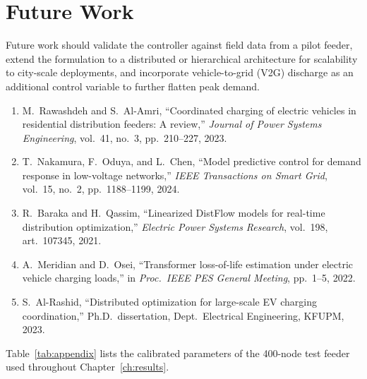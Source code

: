 \documentclass[12pt,twoside]{report}
\begin{document}
\section{Future Work}
Future work should validate the controller against field data from a pilot feeder, extend the
formulation to a distributed or hierarchical architecture for scalability to city-scale
deployments, and incorporate vehicle-to-grid (V2G) discharge as an additional control variable
to further flatten peak demand.

\begingroup
\renewcommand{\chapter}[2][]{\vspace{0.6cm}}
{}
\endgroup

\chapter*{References}
\begin{enumerate}[leftmargin=1.4cm,itemsep=6pt]
\item M.\ Rawashdeh and S.\ Al-Amri, ``Coordinated charging of electric vehicles in
  residential distribution feeders: A review,'' \textit{Journal of Power Systems Engineering},
  vol.\ 41, no.\ 3, pp.\ 210--227, 2023.
\item T.\ Nakamura, F.\ Oduya, and L.\ Chen, ``Model predictive control for demand response in
  low-voltage networks,'' \textit{IEEE Transactions on Smart Grid}, vol.\ 15, no.\ 2,
  pp.\ 1188--1199, 2024.
\item R.\ Baraka and H.\ Qassim, ``Linearized DistFlow models for real-time distribution
  optimization,'' \textit{Electric Power Systems Research}, vol.\ 198, art.\ 107345, 2021.
\item A.\ Meridian and D.\ Osei, ``Transformer loss-of-life estimation under electric vehicle
  charging loads,'' in \textit{Proc.\ IEEE PES General Meeting}, pp.\ 1--5, 2022.
\item S.\ Al-Rashid, ``Distributed optimization for large-scale EV charging coordination,''
  Ph.D.\ dissertation, Dept.\ Electrical Engineering, KFUPM, 2023.
\end{enumerate}

\chapter*{Appendix A: Feeder Model Parameters}
Table~\ref{tab:appendix} lists the calibrated parameters of the 400-node test feeder used
throughout Chapter~\ref{ch:results}.
\end{document}
